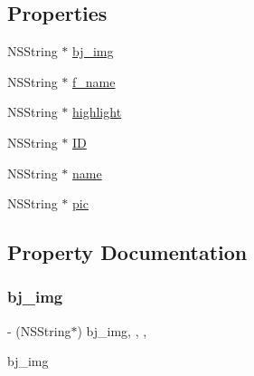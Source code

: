 \subsection*{Properties}
\begin{DoxyCompactItemize}
\item 
N\+S\+String $\ast$ \mbox{\hyperlink{interface_f_n_t_b_rebate_hot_model_a2e670dd4d0e8857b69d86556e39f044a}{bj\+\_\+img}}
\item 
N\+S\+String $\ast$ \mbox{\hyperlink{interface_f_n_t_b_rebate_hot_model_a3d5f02b23e1c5c742cbaffedab629eaf}{f\+\_\+name}}
\item 
N\+S\+String $\ast$ \mbox{\hyperlink{interface_f_n_t_b_rebate_hot_model_abb788cbe3c2ca9f80b247d15a3df1f18}{highlight}}
\item 
N\+S\+String $\ast$ \mbox{\hyperlink{interface_f_n_t_b_rebate_hot_model_aa3c6ea0caa6c28101271154929d0bf85}{ID}}
\item 
N\+S\+String $\ast$ \mbox{\hyperlink{interface_f_n_t_b_rebate_hot_model_a1a78a93931d7b73a74cd5c458dd92ab0}{name}}
\item 
N\+S\+String $\ast$ \mbox{\hyperlink{interface_f_n_t_b_rebate_hot_model_aa165822b252185a8ccea73cd42ce0897}{pic}}
\end{DoxyCompactItemize}


\subsection{Property Documentation}
\mbox{\label{interface_f_n_t_b_rebate_hot_model_a2e670dd4d0e8857b69d86556e39f044a}} 
\subsubsection{\texorpdfstring{bj\+\_\+img}{bj\_img}}
{\footnotesize\ttfamily -\/ (N\+S\+String$\ast$) bj\+\_\+img\hspace{0.3cm}{\ttfamily [read]}, {\ttfamily [write]}, {\ttfamily [nonatomic]}, {\ttfamily [copy]}}

bj\+\_\+img \mbox{\label{interface_f_n_t_b_rebate_hot_model_a3d5f02b23e1c5c742cbaffedab629eaf}} 
